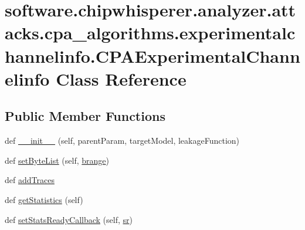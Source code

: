 \hypertarget{classsoftware_1_1chipwhisperer_1_1analyzer_1_1attacks_1_1cpa__algorithms_1_1experimentalchannelif6c161da2587ecb2ba5aefd93c43622a}{}\section{software.\+chipwhisperer.\+analyzer.\+attacks.\+cpa\+\_\+algorithms.\+experimentalchannelinfo.\+C\+P\+A\+Experimental\+Channelinfo Class Reference}
\label{classsoftware_1_1chipwhisperer_1_1analyzer_1_1attacks_1_1cpa__algorithms_1_1experimentalchannelif6c161da2587ecb2ba5aefd93c43622a}
\subsection*{Public Member Functions}
\begin{DoxyCompactItemize}
\item 
def \hyperlink{classsoftware_1_1chipwhisperer_1_1analyzer_1_1attacks_1_1cpa__algorithms_1_1experimentalchannelif6c161da2587ecb2ba5aefd93c43622a_a58cef4fba8e005106abae007757727f7}{\+\_\+\+\_\+init\+\_\+\+\_\+} (self, parent\+Param, target\+Model, leakage\+Function)
\item 
def \hyperlink{classsoftware_1_1chipwhisperer_1_1analyzer_1_1attacks_1_1cpa__algorithms_1_1experimentalchannelif6c161da2587ecb2ba5aefd93c43622a_adb86a8c15ab23ef1fe17439f68c05b4e}{set\+Byte\+List} (self, \hyperlink{classsoftware_1_1chipwhisperer_1_1analyzer_1_1attacks_1_1cpa__algorithms_1_1experimentalchannelif6c161da2587ecb2ba5aefd93c43622a_a6ef4a4594c498869ef09bd4163a64d48}{brange})
\item 
def \hyperlink{classsoftware_1_1chipwhisperer_1_1analyzer_1_1attacks_1_1cpa__algorithms_1_1experimentalchannelif6c161da2587ecb2ba5aefd93c43622a_a50294e7f0ed61171af946b7ced09a882}{add\+Traces}
\item 
def \hyperlink{classsoftware_1_1chipwhisperer_1_1analyzer_1_1attacks_1_1cpa__algorithms_1_1experimentalchannelif6c161da2587ecb2ba5aefd93c43622a_a67eeff1b96cd7ee62a01bd3b444964b7}{get\+Statistics} (self)
\item 
def \hyperlink{classsoftware_1_1chipwhisperer_1_1analyzer_1_1attacks_1_1cpa__algorithms_1_1experimentalchannelif6c161da2587ecb2ba5aefd93c43622a_a70e2d36609fe5c3f1b7f6fc791cdd7ae}{set\+Stats\+Ready\+Callback} (self, \hyperlink{classsoftware_1_1chipwhisperer_1_1analyzer_1_1attacks_1_1cpa__algorithms_1_1experimentalchannelif6c161da2587ecb2ba5aefd93c43622a_a9ce3bc1dc637d259b0435741691d7bff}{sr})
\end{DoxyCompactItemize}
